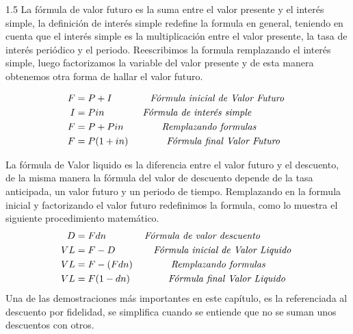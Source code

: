 \begin{spacing}{1.5}
 La fórmula de valor futuro es la suma entre el valor presente y el interés simple, la definición de interés simple  redefine la formula en general, teniendo en cuenta que el interés simple es la multiplicación entre el valor presente, la tasa de interés periódico y el periodo. Reescribimos la formula remplazando el interés simple, luego factorizamos la variable del valor presente y de esta manera obtenemos otra forma de hallar el valor futuro.
 \begin{center}
  \begin{align*}
   F & = P+I\hspace{40 pt} \textit{Fórmula inicial de Valor Futuro } \\
   I & = Pin\hspace{40 pt} \textit{Fórmula de interés simple}        \\
   F & = P+Pin\hspace{40 pt} \textit{Remplazando formulas}           \\
   F & = P(1+in)\hspace{40 pt} \textit{Fórmula final Valor Futuro}
  \end{align*}
 \end{center}
 La fórmula de Valor liquido es la diferencia entre el valor futuro y el descuento, de la misma manera la fórmula del valor de descuento depende de la tasa anticipada, un valor futuro y un periodo de tiempo. Remplazando en la formula inicial y factorizando el valor futuro redefinimos la formula, como lo muestra el siguiente procedimiento matemático.
 \clearpage
 \begin{align*}
  D  & = Fdn\hspace{40 pt} \textit{Fórmula de valor descuento }       \\
  VL & = F-D\hspace{40 pt} \textit{Fórmula inicial de Valor Liquido } \\
  VL & = F-(Fdn)\hspace{40 pt} \textit{Remplazando formulas}          \\
  VL & = F(1-dn)\hspace{40 pt}\textit{Fórmula final Valor Liquido}
 \end{align*}
 Una de las demostraciones más importantes en este capítulo, es la referenciada al descuento por fidelidad, se simplifica cuando se entiende que no se suman unos descuentos con otros. %

\end{spacing}
